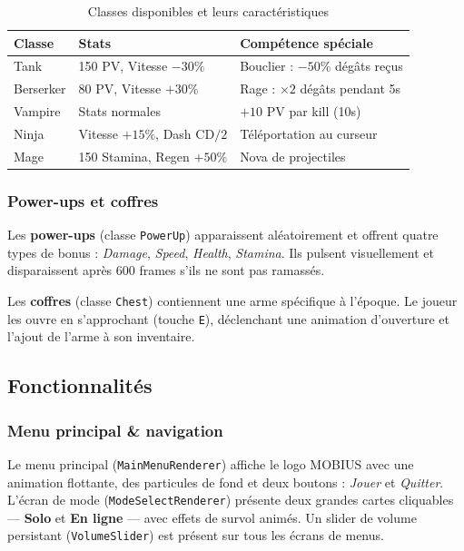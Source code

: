 \documentclass[12pt,a4paper]{article}
\begin{document}
\begin{table}[H]
\centering
\caption{Classes disponibles et leurs caractéristiques}
\renewcommand{\arraystretch}{1.35}
\begin{tabular}{@{}lll@{}}
\toprule
\rowcolor{tableheadbg}
\textbf{Classe} & \textbf{Stats} & \textbf{Compétence spéciale} \\
\midrule
Tank       & 150 PV, Vitesse $-30\%$ & Bouclier : $-50\%$ dégâts reçus \\
\rowcolor{rowaltbg}
Berserker  & 80 PV, Vitesse $+30\%$  & Rage : $\times 2$ dégâts pendant 5s \\
Vampire    & Stats normales           & $+10$ PV par kill (10s) \\
\rowcolor{rowaltbg}
Ninja      & Vitesse $+15\%$, Dash CD$/2$       & Téléportation au curseur \\
Mage       & 150 Stamina, Regen $+50\%$          & Nova de projectiles \\
\bottomrule
\end{tabular}
\end{table}

\subsubsection*{Power-ups et coffres}

Les \textbf{power-ups} (classe \texttt{PowerUp}) apparaissent aléatoirement et offrent quatre types de bonus : \textit{Damage}, \textit{Speed}, \textit{Health}, \textit{Stamina}. Ils pulsent visuellement et disparaissent après 600 frames s'ils ne sont pas ramassés.

Les \textbf{coffres} (classe \texttt{Chest}) contiennent une arme spécifique à l'époque. Le joueur les ouvre en s'approchant (touche \texttt{E}), déclenchant une animation d'ouverture et l'ajout de l'arme à son inventaire.

\subsection{Fonctionnalités}

\subsubsection*{Menu principal \& navigation}

Le menu principal (\texttt{MainMenuRenderer}) affiche le logo MOBIUS avec une animation flottante, des particules de fond et deux boutons : \textit{Jouer} et \textit{Quitter}. L'écran de mode (\texttt{ModeSelectRenderer}) présente deux grandes cartes cliquables --- \textbf{Solo} et \textbf{En ligne} --- avec effets de survol animés. Un slider de volume persistant (\texttt{VolumeSlider}) est présent sur tous les écrans de menus.
\end{document}
